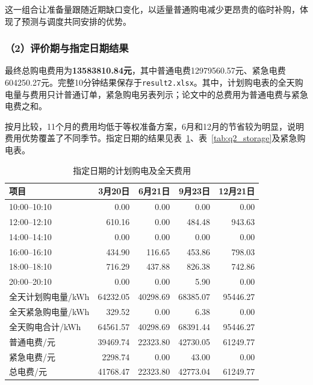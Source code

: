 这一组合让准备量跟随近期缺口变化，以适量普通购电减少更昂贵的临时补购，体现了预测与调度共同安排的优势。

\subsubsection*{（2）评价期与指定日期结果}
最终总购电费用为\textbf{13583810.84元}，其中普通电费12979560.57元、紧急电费604250.27元。完整10分钟结果保存于\texttt{result2.xlsx}。其中，计划购电表的全天购电量与费用只计普通订单，紧急购电另表列示；论文中的总费用为普通电费与紧急电费之和。

按月比较，11个月的费用均低于等权准备方案，6月和12月的节省较为明显，说明费用优势覆盖了不同季节。指定日期的结果见表~\ref{tab:q2_specified_purchase}、表~\ref{tab:q2_storage}及紧急购电表。

\begin{table}[!htbp]
\centering
\caption{指定日期的计划购电及全天费用}
\label{tab:q2_specified_purchase}
\begin{tabular}{lrrrr}
\hline
项目 & 3月20日 & 6月21日 & 9月23日 & 12月21日 \\
\hline
10:00--10:10
& 0.00 & 0.00 & 0.00 & 0.00 \\
12:00--12:10
& 610.16 & 0.00 & 484.48 & 943.63 \\
14:00--14:10
& 0.00 & 0.00 & 0.00 & 0.00 \\
16:00--16:10
& 434.90 & 116.65 & 453.86 & 798.03 \\
18:00--18:10
& 716.29 & 437.88 & 826.38 & 742.86 \\
20:00--20:10
& 0.00 & 0.00 & 5.90 & 0.00 \\
全天计划购电量/kWh
& 64232.05 & 40298.69 & 68385.07 & 95446.27 \\
全天紧急购电量/kWh
& 329.52 & 0.00 & 6.38 & 0.00 \\
全天购电合计/kWh
& 64561.57 & 40298.69 & 68391.44 & 95446.27 \\
普通电费/元
& 39469.74 & 22323.80 & 42730.05 & 61249.77 \\
紧急电费/元
& 2298.74 & 0.00 & 43.00 & 0.00 \\
总电费/元
& 41768.47 & 22323.80 & 42773.04 & 61249.77 \\
\hline
\end{tabular}
\end{table}

